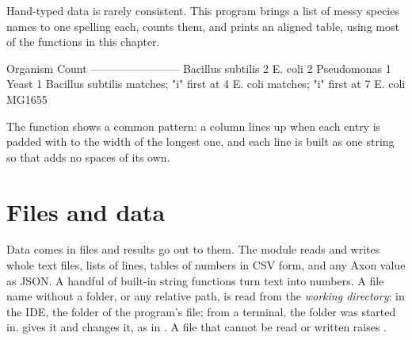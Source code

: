 \documentclass[11pt,a4paper,openany]{report}
\begin{document}
{{Hand-typed data is rarely consistent. This program brings a list of messy
species names to one spelling each, counts them, and prints an aligned table,
using most of the functions in this chapter.

\begin{axonout}
Organism           Count
------------------------
Bacillus subtilis  2
E. coli            2
Pseudomonas        1
Yeast              1
Bacillus subtilis matches; "i" first at 4
E. coli matches; "i" first at 7
E. coli MG1655
\end{axonout}

The  function shows a common pattern: a column lines up when each
entry is padded with  to the width of the
longest one, and each line is built as one string so that 
adds no spaces of its own.

\chapter{Files and data}\label{ch:files}

Data comes in files and results go out to them. The  module reads
and writes whole text files, lists of lines, tables of numbers in CSV form, and
any Axon value as JSON. A handful of built-in string functions turn text into
numbers. A file name without a folder, or any relative path, is read from
the \emph{working directory}: in the IDE, the folder of the program's file; from
a terminal, the folder  was started in. 
gives it and  changes it, as in
. A file that cannot be read or written
raises .

}}
\end{document}
